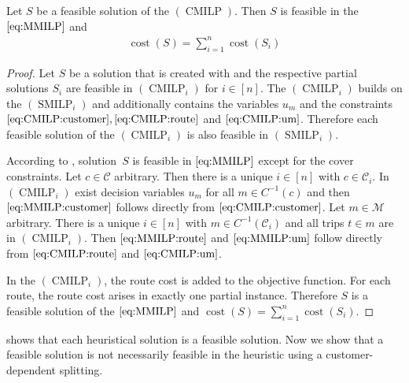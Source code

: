 \begin{theorem}
\label{thm:equivalence_CMILP_MMILP}

Let $S$ be a feasible solution of the $(\operatorname{CMILP})$. Then $S$ is feasible in the $\eqref{eq:MMILP}$ and
\begin{align*}
	\operatorname{cost}\left(S\right) = \sum_{i=1}^n\operatorname{cost}\left(S_i\right)
\end{align*}

\end{theorem}

\begin{proof}

Let $S$ be a solution that is created with  and the respective partial solutions $S_i$ are feasible in $(\operatorname{CMILP}_i)$ for ${i\in[n]}$. The $(\operatorname{CMILP}_i)$ builds on the $(\operatorname{SMILP}_i)$ and additionally contains the variables $u_m$ and the constraints $\eqref{eq:CMILP:customer}, \eqref{eq:CMILP:route}$ and $\eqref{eq:CMILP:um}$. Therefore each feasible solution of the $(\operatorname{CMILP}_i)$ is also feasible in $(\operatorname{SMILP}_i)$.

According to , solution~$S$ is feasible in $\eqref{eq:MMILP}$ except for the cover constraints. Let $c\in\mathcal{C}$ arbitrary. Then there is a unique $i\in[n]$ with ${c\in\mathcal{C}_i}$. In $(\operatorname{CMILP}_i)$ exist decision variables $u_m$ for all ${m\in C^{-1}(c)}$ and then $\eqref{eq:MMILP:customer}$ follows directly from $\eqref{eq:CMILP:customer}$. Let ${m\in\mathcal{M}}$ arbitrary. There is a unique ${i\in[n]}$ with ${m\in C^{-1}(\mathcal{C}_i)}$ and all trips ${t\in m}$ are in $(\operatorname{CMILP}_i)$. Then $\eqref{eq:MMILP:route}$ and $\eqref{eq:MMILP:um}$ follow directly from $\eqref{eq:CMILP:route}$ and $\eqref{eq:CMILP:um}$. 

In the $(\operatorname{CMILP}_i)$, the route cost is added to the objective function. For each route, the route cost arises in exactly one partial instance. Therefore $S$ is a feasible solution of the $\eqref{eq:MMILP}$ and ${\operatorname{cost}(S) = \sum_{i=1}^n\operatorname{cost}\left(S_i\right)}$.

\end{proof}

 shows that each heuristical solution is a feasible solution. Now we show that a feasible solution is not necessarily feasible in the heuristic using a customer-dependent splitting.

